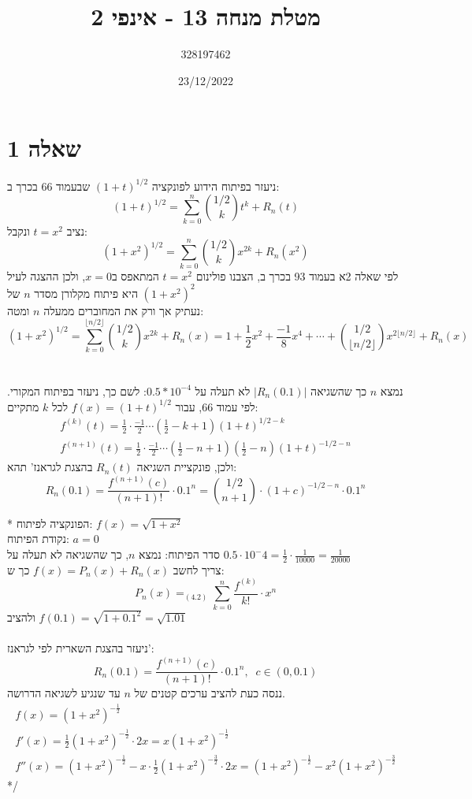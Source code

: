 \documentclass{article}
\title{מטלת מנחה 13 - אינפי 2}
\author{328197462}
\date{23/12/2022}
\DeclareMathOperator*{\equals}{=}
\begin{document}
\long{}
\maketitle

\section*{שאלה 1}

ניעזר בפיתוח הידוע לפונקציה $(1+t)^{1/2}$
שבעמוד 66 בכרך ב:
\[
    (1+t)^{1/2} = \sum_{k=0}^n \binom{1/2}{k}t^k+R_n(t)
\]
נציב $t=x^2$ ונקבל:
\[
    (1+x^2)^{1/2} = \sum_{k=0}^n \binom{1/2}{k}x^{2k}+R_n(x^2)
\]
לפי שאלה 2א בעמוד 93 בכרך ב, הצבנו פולינום $t=x^2$ המתאפס ב$x=0$,
ולכן ההצגה לעיל היא פיתוח מקלורן מסדר $n$ של $(1+x^2)^2$\\
נעתיק אך ורק את המחוברים ממעלה $n$ ומטה:
\[
    (1+x^2)^{1/2} =
    \sum_{k=0}^{\lfloor n/2 \rfloor} \binom{1/2}{k}x^{2k} + R_n(x) = 1 + \frac{1}{2}x^2+\frac{-1}{8}x^4+\cdots + \binom{1/2}{\lfloor n/2 \rfloor}x^{2\lfloor n/2 \rfloor} + R_n(x)
\]
\\\\
נמצא $n$ כך שהשגיאה $|R_n(0.1)|$ לא תעלה על $0.5*10^{-4}$:
לשם כך, ניעזר בפיתוח המקורי. לפי עמוד 66, עבור $f(x)=(1+t)^{1/2}$ לכל $k$ מתקיים:
\[
    \begin{matrix}
        f^{(k)}(t)=\frac{1}{2}\cdot \frac{-1}{2} \cdots (\frac{1}{2}-k+1)(1+t)^{1/2-k} \\
        f^{(n+1)}(t)=\frac{1}{2}\cdot \frac{-1}{2} \cdots (\frac{1}{2}-n+1)(\frac{1}{2}-n)(1+t)^{-1/2-n}
    \end{matrix}
\]
ולכן, פונקציית השגיאה $R_n(t)$ בהצגת לגראנז' תהא:
\[
    R_n(0.1) = \frac{f^{(n+1)}(c)}{(n+1)!} \cdot 0.1^n=
    \binom{1/2}{n+1}\cdot (1+c)^{-1/2-n} \cdot 0.1^n
\]

\/*
הפונקציה לפיתוח: $f(x)=\sqrt{1+x^2}$ \\
נקודת הפיתוח: $a=0$ \\
סדר הפיתוח: נמצא $n$,
כך שהשגיאה לא תעלה על $0.5\cdot 10^-4=\frac{1}{2}\cdot \frac{1}{10000}=\frac{1}{20000}$ \\
צריך לחשב $f(x)=P_n(x)+R_n(x)$ כך ש:
\[
    P_n(x) \equals_{(4.2)}\sum_{k=0}^n \frac{f^{(k)}}{k!}\cdot x^n
\]
ולהציב $f(0.1)=\sqrt{1+0.1^2}=\sqrt{1.01}$
\\\\
ניעזר בהצגת השארית לפי לגראנז': \\
\[
    R_n(0.1)=\frac{f^{(n+1)}(c)}{(n+1)!}\cdot {0.1}^n, \;\; c\in (0,0.1)
\]
ננסה כעת להציב ערכים קטנים של $n$ עד שנגיע לשגיאה הדרושה.
\[
    \begin{matrix}
        f(x) = (1+x^2)^{-\frac{1}{2}}                                                \\
        f'(x) = \frac{1}{2}(1+x^2)^{-\frac{1}{2}} \cdot 2x = x(1+x^2)^{-\frac{1}{2}} \\
        f''(x) = (1+x^2)^{-\frac{1}{2}} - x \cdot \frac{1}{2}(1+x^2)^{-\frac{3}{2}} \cdot 2x = (1+x^2)^{-\frac{1}{2}} - x^2(1+x^2)^{-\frac{3}{2}}
    \end{matrix}
\]
*/
\end{document}
